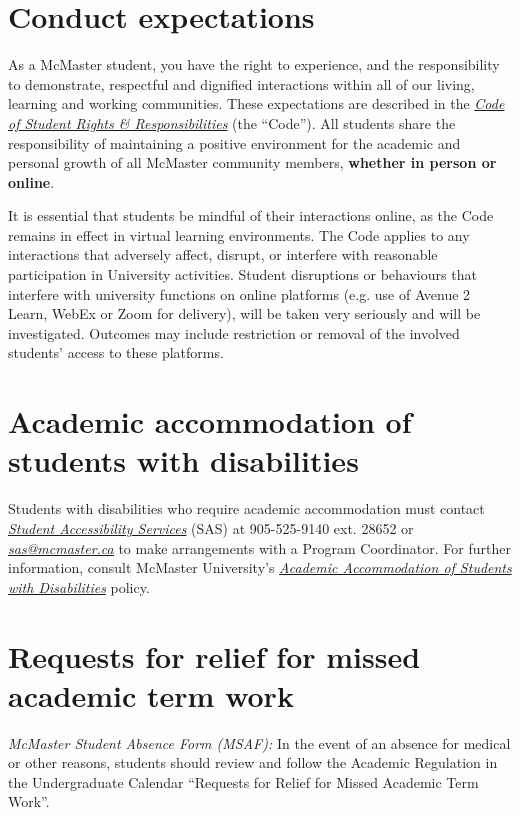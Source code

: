 \documentclass[12pt]{article}
\begin{document}
\section*{Conduct expectations}

As a McMaster student, you have the right to experience, and the
responsibility to demonstrate, respectful and dignified interactions
within all of our living, learning and working communities. These
expectations are described in the
\href{https://secretariat.mcmaster.ca/app/uploads/Code-of-Student-Rights-and-Responsibilities.pdf}{\emph{\emph{Code
of Student Rights \& Responsibilities}}} (the ``Code''). All students
share the responsibility of maintaining a positive environment for the
academic and personal growth of all McMaster community members,
\textbf{whether in person or online}.

It is essential that students be mindful of their interactions online,
as the Code remains in effect in virtual learning environments. The Code
applies to any interactions that adversely affect, disrupt, or interfere
with reasonable participation in University activities. Student
disruptions or behaviours that interfere with university functions on
online platforms (e.g. use of Avenue 2 Learn, WebEx or Zoom for
delivery), will be taken very seriously and will be investigated.
Outcomes may include restriction or removal of the involved students'
access to these platforms.

\section*{Academic accommodation of students with disabilities}

Students with disabilities who require academic accommodation must
contact \href{https://sas.mcmaster.ca/}{\emph{Student Accessibility
Services}} (SAS) at 905-525-9140 ext. 28652 or
\href{mailto:sas@mcmaster.ca}{\emph{sas@mcmaster.ca}} to make
arrangements with a Program Coordinator. For further information,
consult McMaster University's
\href{https://secretariat.mcmaster.ca/app/uploads/Academic-Accommodations-Policy.pdf}{\emph{\emph{Academic
Accommodation of Students with Disabilities}}} policy.

\section*{Requests for relief for missed academic term work}

\emph{McMaster Student Absence Form (MSAF):} In the event of an absence
for medical or other reasons, students should review and follow the
Academic Regulation in the Undergraduate Calendar ``Requests for Relief
for Missed Academic Term Work''.
\end{document}
